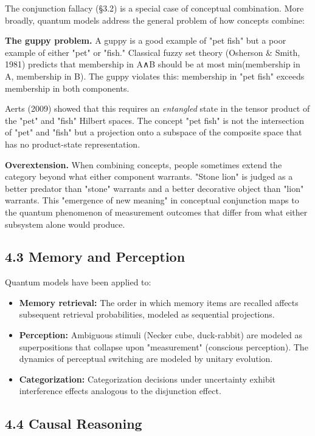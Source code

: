 \documentclass[11pt]{article}
\begin{document}
The conjunction fallacy (§3.2) is a special case of conceptual combination. More
broadly, quantum models address the general problem of how concepts combine:

\textbf{The guppy problem.} A guppy is a good example of "pet fish" but a poor example
of either "pet" or "fish." Classical fuzzy set theory (Osherson \& Smith, 1981)
predicts that membership in A∧B should be at most min(membership in A, membership
in B). The guppy violates this: membership in "pet fish" exceeds membership in
both components.

Aerts (2009) showed that this requires an \emph{entangled} state in the tensor product
of the "pet" and "fish" Hilbert spaces. The concept "pet fish" is not the
intersection of "pet" and "fish" but a projection onto a subspace of the composite
space that has no product-state representation.

\textbf{Overextension.} When combining concepts, people sometimes extend the category
beyond what either component warrants. "Stone lion" is judged as a better
predator than "stone" warrants and a better decorative object than "lion" warrants.
This "emergence of new meaning" in conceptual conjunction maps to the quantum
phenomenon of measurement outcomes that differ from what either subsystem alone
would produce.
\subsection{4.3 Memory and Perception}
\label{sec:org48d7372}

Quantum models have been applied to:
\begin{itemize}
\item \textbf{Memory retrieval:} The order in which memory items are recalled affects
subsequent retrieval probabilities, modeled as sequential projections.
\item \textbf{Perception:} Ambiguous stimuli (Necker cube, duck-rabbit) are modeled as
superpositions that collapse upon "measurement" (conscious perception).
The dynamics of perceptual switching are modeled by unitary evolution.
\item \textbf{Categorization:} Categorization decisions under uncertainty exhibit
interference effects analogous to the disjunction effect.
\end{itemize}
\subsection{4.4 Causal Reasoning}
\label{sec:org4b56273}
\end{document}
